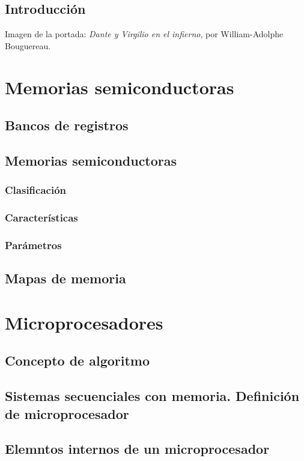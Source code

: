 \documentclass[a4paper]{book}
\begin{document}
\newpage
{}
{}
\section*{Introducción}
Imagen de la portada: \textsl{Dante y Virgilio en el infierno}, por William-Adolphe Bouguereau.
\newpage

\setlength{\parskip}{0em}
\tableofcontents 
\setlength{\parskip}{0.5em}

\chapter{Memorias semiconductoras}
\section{Bancos de registros}
\section{Memorias semiconductoras}
\subsection{Clasificación}
\subsection{Características}
\subsection{Parámetros}

\section{Mapas de memoria}

\chapter{Microprocesadores}
\section{Concepto de algoritmo}
\section{Sistemas secuenciales con memoria. Definición de microprocesador}
\section{Elemntos internos de un microprocesador}
\end{document}
